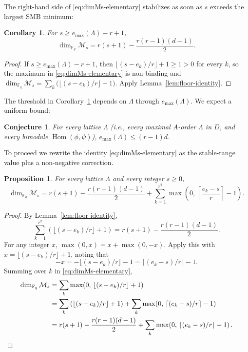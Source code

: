 \documentclass[12pt]{amsart}
\newtheorem{prop}[thm]{Proposition}
\newtheorem{cor}[thm]{Corollary}
\newtheorem{conj}[thm]{Conjecture}
\theoremstyle{definition}
\theoremstyle{remark}
\numberwithin{equation}{section}
\numberwithin{thm}{section}
\DeclareMathOperator{\Hom}{Hom}
\newcommand{\cM}{\mathcal{M}}
\newcommand{\F}{\mathbb{F}}
\newcommand{\La}{\Lambda}
\begin{document}
	The right-hand side of \eqref{eq:dimMs-elementary} stabilizes as soon as $s$ exceeds the largest SMB minimum:
	
	\begin{cor}\label{cor:stable-range-per-Lambda}
		For $s \geq e_{\max}(\La) - r + 1$,
		\[
		\dim_{\F_q}\cM_s = r(s+1) - \frac{r(r-1)(d-1)}{2}.
		\]
	\end{cor}
	
	\begin{proof}
		If $s \geq e_{\max}(\La) - r + 1$, then $\lfloor(s-e_k)/r\rfloor + 1 \geq 1 > 0$ for every $k$, so the maximum in \eqref{eq:dimMs-elementary} is non-binding and $\dim_{\F_q}\cM_s = \sum_k\bigl(\lfloor(s-e_k)/r\rfloor + 1\bigr)$. Apply Lemma~\ref{lem:floor-identity}.
	\end{proof}
	
	The threshold in Corollary~\ref{cor:stable-range-per-Lambda} depends on $\La$ through $e_{\max}(\La)$. We expect a uniform bound:
	
	\begin{conj}\label{conj:emax-bound}
		For every lattice $\La$ (i.e., every maximal $A$-order $\La$ in $D$, and every bimodule $\Hom(\phi,\psi)$), $e_{\max}(\La) \leq (r-1)d$.
	\end{conj}
	
	To proceed we rewrite the identity \eqref{eq:dimMs-elementary} as the stable-range value plus a non-negative correction.
	
	\begin{prop}\label{prop:dimMs-additive}
		For every lattice $\La$ and every integer $s \geq 0$,
		\begin{equation}\label{eq:dimMs-additive}
			\dim_{\F_q}\cM_s = r(s+1) - \frac{r(r-1)(d-1)}{2} + \sum_{k=1}^{r^2}\max\!\left(0,\, \left\lceil\frac{e_k - s}{r}\right\rceil - 1\right).
		\end{equation}
	\end{prop}
	
	\begin{proof}
		By Lemma~\ref{lem:floor-identity},
		\[
		\sum_{k=1}^{r^2}\left(\lfloor(s-e_k)/r\rfloor + 1\right) = r(s+1) - \frac{r(r-1)(d-1)}{2}.
		\]
		For any integer $x$, $\max(0, x) = x + \max(0, -x)$. Apply this with $x = \lfloor(s-e_k)/r\rfloor + 1$, noting that
		\[
		-x = -\lfloor(s-e_k)/r\rfloor - 1 = \lceil(e_k - s)/r\rceil - 1.
		\]
		Summing over $k$ in \eqref{eq:dimMs-elementary},
		\begin{align*}
			\dim_{\F_q}\cM_s &= \sum_k\max\!\left(0,\, \lfloor(s-e_k)/r\rfloor + 1\right) \\
			&= \sum_k\left(\lfloor(s-e_k)/r\rfloor + 1\right) + \sum_k\max\!\left(0,\, \lceil(e_k - s)/r\rceil - 1\right) \\
			&= r(s+1) - \frac{r(r-1)(d-1)}{2} + \sum_k\max\!\left(0,\, \lceil(e_k - s)/r\rceil - 1\right). \qedhere
		\end{align*}
	\end{proof}
	
\end{document}
